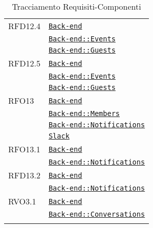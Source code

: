 \begin{longtable}{|>{\centering}m{3cm}|m{10cm}<{\centering}|}
RFD12.4 & \hyperref[Back-end]{\texttt{Back-end}}\\
& \hyperref[Back-end::Events]{\texttt{Back-end::Events}}\\
& \hyperref[Back-end::Guests]{\texttt{Back-end::Guests}}\\ \hline

RFD12.5 & \hyperref[Back-end]{\texttt{Back-end}}\\
& \hyperref[Back-end::Events]{\texttt{Back-end::Events}}\\
& \hyperref[Back-end::Guests]{\texttt{Back-end::Guests}}\\ \hline

RFO13 & \hyperref[Back-end]{\texttt{Back-end}}\\
& \hyperref[Back-end::Members]{\texttt{Back-end::Members}}\\
& \hyperref[Back-end::Notifications]{\texttt{Back-end::Notifications}}\\
& \hyperref[Slack]{\texttt{Slack}}\\ \hline

RFO13.1 & \hyperref[Back-end]{\texttt{Back-end}}\\
& \hyperref[Back-end::Notifications]{\texttt{Back-end::Notifications}}\\ \hline

RFD13.2 & \hyperref[Back-end]{\texttt{Back-end}}\\
& \hyperref[Back-end::Notifications]{\texttt{Back-end::Notifications}}\\ \hline

RVO3.1 & \hyperref[Back-end]{\texttt{Back-end}}\\
& \hyperref[Back-end::Conversations]{\texttt{Back-end::Conversations}}\\ \hline

\caption[Tracciamento Requisiti-Componenti]{Tracciamento Requisiti-Componenti}
\label{tabella:requi-pack}
\end{longtable}
\clearpage
